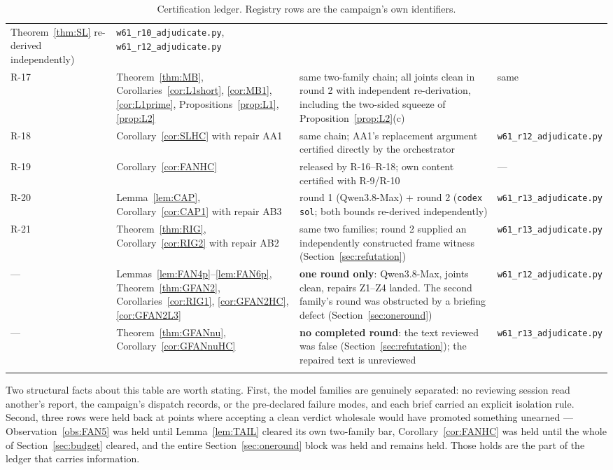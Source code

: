 \begin{center}
\begin{longtable}{@{}p{}p{}p{}p{}@{}}
Theorem~\ref{thm:SL} re-derived independently) & \texttt{w61\_r10\_adjudicate.py},
\texttt{w61\_r12\_adjudicate.py} \\
R-17 & Theorem~\ref{thm:MB}, Corollaries~\ref{cor:L1short}, \ref{cor:MB1},
\ref{cor:L1prime}, Propositions~\ref{prop:L1}, \ref{prop:L2} & same two-family chain;
all joints clean in round 2 with independent re-derivation, including the two-sided
squeeze of Proposition~\ref{prop:L2}(c) & same \\
R-18 & Corollary~\ref{cor:SLHC} with repair AA1 & same chain; AA1's replacement argument
certified directly by the orchestrator & \texttt{w61\_r12\_adjudicate.py} \\
R-19 & Corollary~\ref{cor:FANHC} & released by R-16--R-18; own content certified with
R-9/R-10 & --- \\
R-20 & Lemma~\ref{lem:CAP}, Corollary~\ref{cor:CAP1} with repair AB3 &
round 1 (Qwen3.8-Max) + round 2 (\texttt{codex} \texttt{sol}; both bounds re-derived
independently) & \texttt{w61\_r13\_adjudicate.py} \\
R-21 & Theorem~\ref{thm:RIG}, Corollary~\ref{cor:RIG2} with repair AB2 &
same two families; round 2 supplied an independently constructed frame witness
(Section~\ref{sec:refutation}) & \texttt{w61\_r13\_adjudicate.py} \\
\midrule
--- & Lemmas~\ref{lem:FAN4p}--\ref{lem:FAN6p}, Theorem~\ref{thm:GFAN2},
Corollaries~\ref{cor:RIG1}, \ref{cor:GFAN2HC}, \ref{cor:GFAN2L3} &
\textbf{one round only}: Qwen3.8-Max, joints clean, repairs Z1--Z4 landed. The second
family's round was obstructed by a briefing defect (Section~\ref{sec:oneround}) &
\texttt{w61\_r12\_adjudicate.py} \\
--- & Theorem~\ref{thm:GFANnu}, Corollary~\ref{cor:GFANnuHC} &
\textbf{no completed round}: the text reviewed was false
(Section~\ref{sec:refutation}); the repaired text is unreviewed &
\texttt{w61\_r13\_adjudicate.py} \\
\bottomrule
\caption{Certification ledger. Registry rows are the campaign's own identifiers.}
\label{tab:ledger}
\end{longtable}
\end{center}

Two structural facts about this table are worth stating. First, the model families are
genuinely separated: no reviewing session read another's report, the campaign's dispatch
records, or the pre-declared failure modes, and each brief carried an explicit isolation
rule. Second, three rows were held back at points where accepting a clean verdict wholesale
would have promoted something unearned --- Observation~\ref{obs:FAN5} was held until
Lemma~\ref{lem:TAIL} cleared its own two-family bar, Corollary~\ref{cor:FANHC} was held
until the whole of Section~\ref{sec:budget} cleared, and the entire
Section~\ref{sec:oneround} block was held and remains held. Those holds are the part of the
ledger that carries information.

